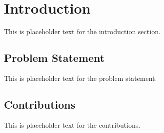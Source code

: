 \section{Introduction}

This is placeholder text for the introduction section.

\subsection{Problem Statement}

This is placeholder text for the problem statement.

\subsection{Contributions}

This is placeholder text for the contributions.


